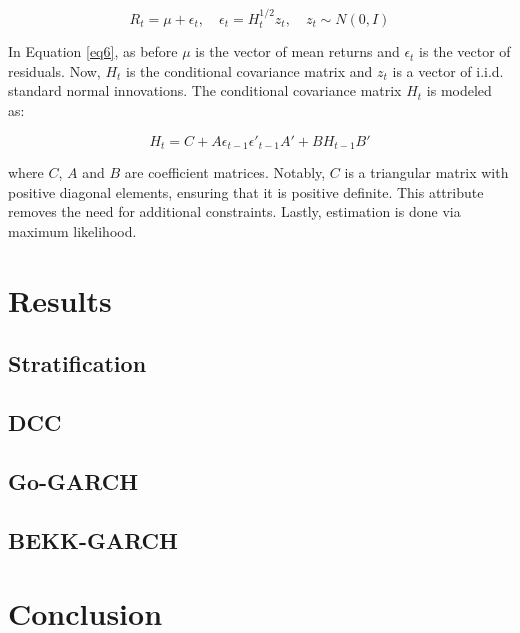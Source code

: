 \documentclass[11pt,preprint, authoryear]{elsarticle}
\numberwithin{equation}{section}
\numberwithin{figure}{section}
\numberwithin{table}{section}
\begin{document}
\begin{equation}
R_t = \mu + \epsilon_t, \quad \epsilon_t = H_t^{1/2} z_t, \quad z_t \sim N(0, I) \label{eq6}
\end{equation}

In Equation \ref{eq6}, as before \(\mu\) is the vector of mean returns
and \(\epsilon_t\) is the vector of residuals. Now, \(H_t\) is the
conditional covariance matrix and \(z_t\) is a vector of i.i.d. standard
normal innovations. The conditional covariance matrix \(H_t\) is modeled
as:

\begin{equation}
H_t = C + A \epsilon_{t-1} \epsilon'_{t-1} A' + B H_{t-1} B' \label{eq7}
\end{equation}

where \(C\), \(A\) and \(B\) are coefficient matrices. Notably, \(C\) is
a triangular matrix with positive diagonal elements, ensuring that it is
positive definite. This attribute removes the need for additional
constraints. Lastly, estimation is done via maximum likelihood.

\hypertarget{results}{%
\section{Results}\label{results}}

\hypertarget{stratification}{%
\subsection{Stratification}\label{stratification}}

\hypertarget{dcc}{%
\subsection{DCC}\label{dcc}}

\hypertarget{go-garch-1}{%
\subsection{Go-GARCH}\label{go-garch-1}}

\hypertarget{bekk-garch-1}{%
\subsection{BEKK-GARCH}\label{bekk-garch-1}}

\hypertarget{conclusion}{%
\section{Conclusion}\label{conclusion}}
\end{document}
